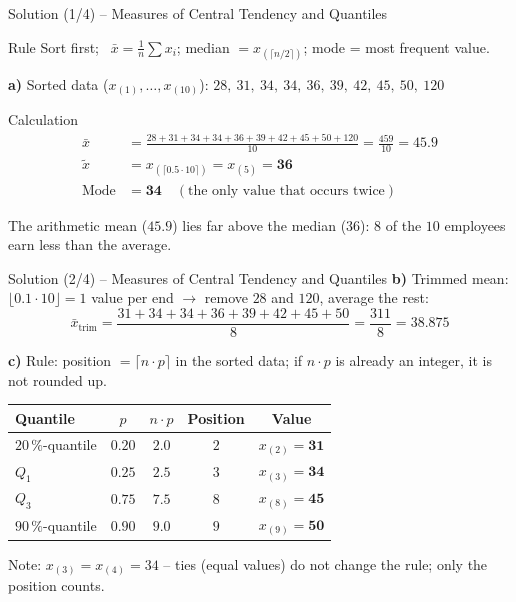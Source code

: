 \documentclass[aspectratio=169,11pt]{beamer}
\begin{document}
\begin{frame}{Solution (1/4) -- Measures of Central Tendency and Quantiles}
  \begin{block}{Rule}
    Sort first; \ $\bar{x} = \frac{1}{n}\sum x_i$; \quad median $= x_{(\lceil n/2 \rceil)}$; \quad mode = most frequent value.
  \end{block}

  \textbf{a)} Sorted data ($x_{(1)}, \ldots, x_{(10)}$): \quad $28,\ 31,\ 34,\ 34,\ 36,\ 39,\ 42,\ 45,\ 50,\ 120$
  \begin{exampleblock}{Calculation}
    \vspace{-0.3cm}
    \begin{align*}
      \bar{x} &= \frac{28 + 31 + 34 + 34 + 36 + 39 + 42 + 45 + 50 + 120}{10} = \frac{459}{10} = \mathbf{45.9} \\[2pt]
      \tilde{x} &= x_{(\lceil 0.5 \cdot 10 \rceil)} = x_{(5)} = \mathbf{36} \\[2pt]
      \text{Mode} &= \mathbf{34} \quad (\text{the only value that occurs twice})
    \end{align*}
  \end{exampleblock}
  The arithmetic mean ($45.9$) lies far above the median ($36$): $8$ of the $10$ employees
  earn less than the average.
\end{frame}

\begin{frame}{Solution (2/4) -- Measures of Central Tendency and Quantiles}
  \textbf{b)} Trimmed mean: $\lfloor 0.1 \cdot 10 \rfloor = 1$ value per end $\to$ remove $28$ and $120$,
  average the rest:
  \[ \bar{x}_{\text{trim}} = \frac{31 + 34 + 34 + 36 + 39 + 42 + 45 + 50}{8} = \frac{311}{8} = \mathbf{38.875} \]

  \textbf{c)} Rule: position $= \lceil n \cdot p \rceil$ in the sorted data; if $n \cdot p$ is already
  an integer, it is not rounded up.
  \begin{center}
    \renewcommand{\arraystretch}{1.1}
    \begin{tabular}{lcccc}
      \toprule
      Quantile & $p$ & $n \cdot p$ & Position & Value \\
      \midrule
      $20\,\%$-quantile & $0.20$ & $2.0$ & $2$ & $x_{(2)} = \mathbf{31}$ \\
      $Q_1$ & $0.25$ & $2.5$ & $3$ & $x_{(3)} = \mathbf{34}$ \\
      $Q_3$ & $0.75$ & $7.5$ & $8$ & $x_{(8)} = \mathbf{45}$ \\
      $90\,\%$-quantile & $0.90$ & $9.0$ & $9$ & $x_{(9)} = \mathbf{50}$ \\
      \bottomrule
    \end{tabular}
  \end{center}

  {\small Note: $x_{(3)} = x_{(4)} = 34$ -- ties (equal values) do not change the rule; only the position counts.}
\end{frame}
\end{document}
